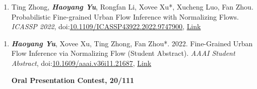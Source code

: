 

\begin{enumerate}[resume]
    \item Ting Zhong, \textit{\textbf{Haoyang Yu}}, Rongfan Li, Xovee Xu*, Xucheng Luo, Fan Zhou. Probabilistic Fine-grained Urban Flow Inference with Normalizing Flows. \textit{ICASSP 2022}, doi:\href{papers/ICASSP_2022_FUFI.pdf}{10.1109/ICASSP43922.2022.9747900}, \href{https://ieeexplore.ieee.org/document/9747900
    }{\color{Green}Link}

\end{enumerate}


\begin{enumerate}[resume]
    \item \textit{\textbf{Haoyang Yu}}, Xovee Xu, Ting Zhong, Fan Zhou*. 2022. Fine-Grained Urban Flow Inference via Normalizing Flow (Student Abstract). \textit{AAAI Student Abstract}, doi:\href{https://doi.org/10.1609/aaai.v36i11.21687}{10.1609/aaai.v36i11.21687}, \href{https://ojs.aaai.org/index.php/AAAI/article/view/21687}{\color{Green}Link}

    \textbf{\color{red}Oral Presentation Contest, 20/111}
\end{enumerate}